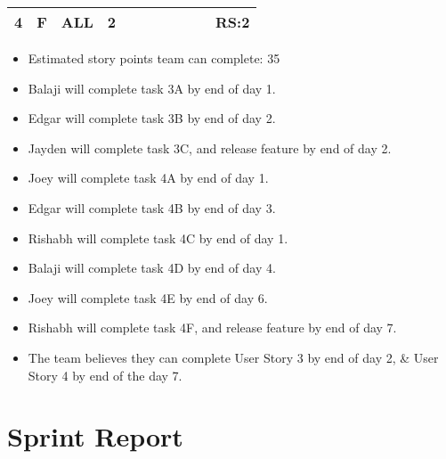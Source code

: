 \documentclass[12pt]{article}
\begin{document}
\begin{table}[H]
\begin{tabular}{@{}c|c|c|c|ccccccc@{}}
4     & F    & ALL        & 2                                                      &                                                 &                                                 &                                                  &                                                  &                                                  &                                                  & RS:2                                             \\ \bottomrule
\end{tabular}
\end{table}

\begin{itemize}%
\item Estimated story points team can complete: 35
\item Balaji will complete task 3A by end of day 1.
\item Edgar will complete task 3B by end of day 2.
\item Jayden will complete task 3C, and release feature by end of day 2.
\item Joey will complete task 4A by end of day 1.
\item Edgar will complete task 4B by end of day 3.
\item Rishabh will complete task 4C by end of day 1.
\item Balaji will complete task 4D by end of day 4.
\item Joey will complete task 4E by end of day 6.
\item Rishabh will complete task 4F, and release feature by end of day 7.
\item The team believes they can complete User Story 3 by end of day 2, \& User Story 4 by end of the day 7. 
\end{itemize}

\newpage

\section{Sprint Report}
\end{document}
